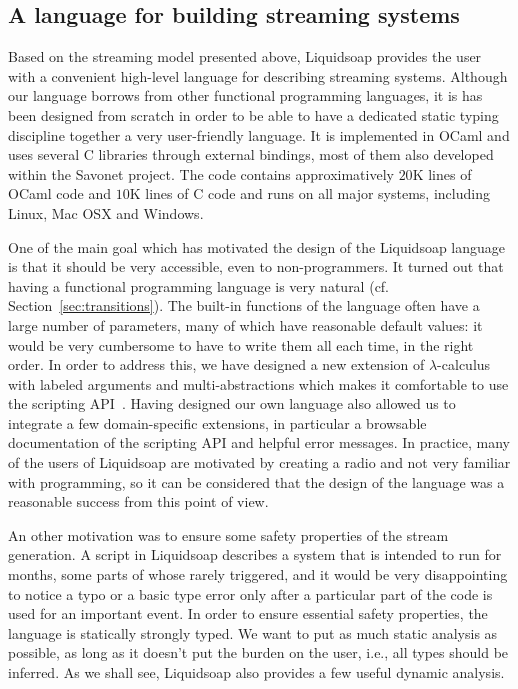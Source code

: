 \documentclass{llncs}
\newcommand{\liquidsoap}{Liquidsoap}
\newcommand{\savonet}{Savonet}
\newcommand{\ie}{{i.e.},}
\newcommand{\cf}{{cf.~}}
\begin{document}
\subsection{A language for building streaming systems}

Based on the streaming model presented above, \liquidsoap{} provides the user
with a convenient high-level language for describing streaming systems.
Although our language borrows from other functional programming languages, it is
has been designed from scratch in order to be able to have a dedicated static
typing discipline together a very user-friendly language. 
It is implemented in OCaml and uses several C libraries 
through external bindings, most of them also developed within the 
\savonet{} project. The code contains approximatively $20$K lines of
OCaml code and $10$K lines of C code and runs on all major systems, including
Linux, Mac OSX and Windows.

One of the main goal which has motivated the design of the \liquidsoap{}
language is that it should be very accessible, even to non-programmers. It
turned out that having a functional programming language is very natural (\cf
Section~\ref{sec:transitions}). The built-in functions of the language often
have a large number of parameters, many of which have reasonable default values:
it would be very cumbersome to have to write them all each time, in the right
order. In order to address this, we have designed a new extension of
$\lambda$-calculus with labeled arguments and multi-abstractions which makes it
comfortable to use the scripting
API~\cite{baelde-mimram:webradio-lambda}. Having designed our own language also
allowed us to integrate a few domain-specific extensions, in particular
a browsable documentation of the scripting API and helpful error messages. In
practice, many of the users of \liquidsoap{} are motivated by creating a radio
and not very familiar with programming, so it can be considered that the design of
the language was a reasonable success from this point of view.

An other motivation was to ensure some safety properties of the stream
generation. A script in \liquidsoap{} describes a system that is intended to run
for months, some parts of whose rarely triggered, and it would be very
disappointing to notice a typo or a basic type error only after a particular
part of the code is used for an important event. In order to ensure essential
safety properties, the language is statically strongly typed. We want to put as
much static analysis as possible, as long as it doesn't put the burden on the
user, \ie{} all types should be inferred. As we shall see, \liquidsoap{} also
provides a few useful dynamic analysis.
\end{document}

